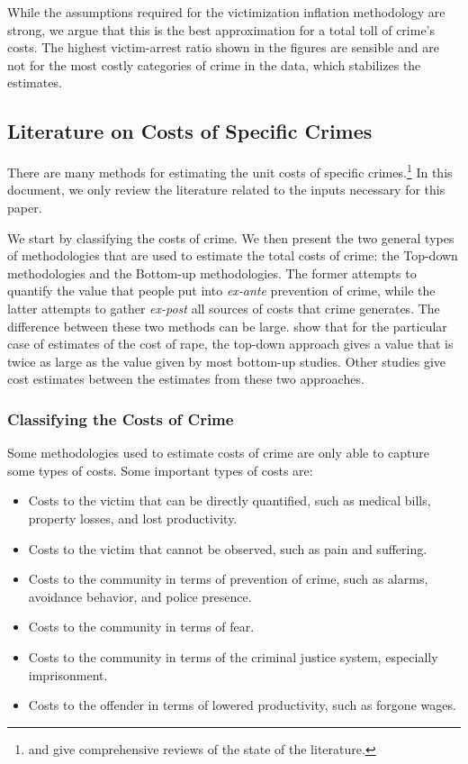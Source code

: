 \noindent While the assumptions required for the victimization inflation methodology are strong, we argue that this is the best approximation for a total toll of crime's costs. The highest victim-arrest ratio shown in the figures are sensible and are not for the most costly categories of crime in the data, which stabilizes the estimates.

\subsection{Literature on Costs of Specific Crimes}
\noindent There are many methods for estimating the unit costs of specific crimes.\footnote{\citet{Cohen-Bowles_2010_Estimating-Cost-Crime} and \citet{McCollister_etal_2010_DAD} give comprehensive reviews of the state of the literature.} In this document, we only review the literature related to the inputs necessary for this paper.

\noindent We start by classifying the costs of crime. We then present the two general types of methodologies that are used to estimate the total costs of crime: the Top-down methodologies and the Bottom-up methodologies. The former attempts to quantify the value that people put into \emph{ex-ante} prevention of crime, while the latter attempts to gather \emph{ex-post} all sources of costs that crime generates. The difference between these two methods can be large. \cite{Cohen-Bowles_2010_Estimating-Cost-Crime} show that for the particular case of estimates of the cost of rape, the top-down approach gives a value that is twice as large as the value given by most bottom-up studies. Other studies give cost estimates between the estimates from these two approaches.

\subsubsection{Classifying the Costs of Crime}
\noindent Some methodologies used to estimate costs of crime are only able to capture some types of costs. Some important types of costs are:
\begin{itemize}
\item Costs to the victim that can be directly quantified, such as medical bills, property losses, and lost productivity.
\item Costs to the victim that cannot be observed, such as pain and suffering.
\item Costs to the community in terms of prevention of crime, such as alarms, avoidance behavior, and police presence.
\item Costs to the community in terms of fear.
\item Costs to the community in terms of the criminal justice system, especially imprisonment.
\item Costs to the offender in terms of lowered productivity, such as forgone wages.
\end{itemize}

